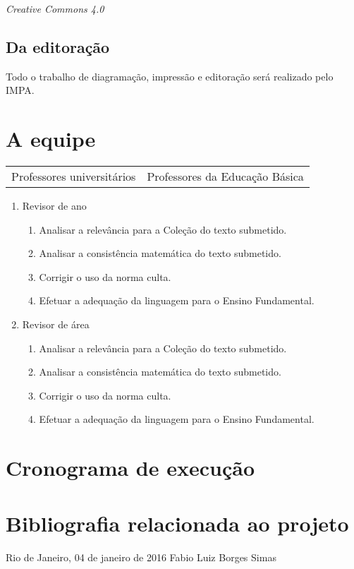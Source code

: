 \documentclass[10 pt]{article}
\begin{document}
{\it Creative Commons 4.0} %

\subsection{Da editoração}
Todo o trabalho de diagramação, impressão e editoração será realizado pelo IMPA.

\section{A equipe}\label{equipe}
\begin{table}[ht]
  \begin{center}
    \begin{tabular}{ll}
      Professores universitários & Professores da Educação Básica  \\
    \end{tabular}
  \end{center}
\end{table}





\begin{enumerate}%
\item Revisor de ano
  \begin{enumerate}%
  \item Analisar a relevância para a Coleção do texto submetido.
  \item Analisar a consistência matemática do texto submetido.
  \item Corrigir o uso da norma culta.
  \item Efetuar a adequação da linguagem para o Ensino Fundamental.
  \end{enumerate}

\item Revisor de área
  \begin{enumerate}%
  \item Analisar a relevância para a Coleção do texto submetido.
  \item Analisar a consistência matemática do texto submetido.
  \item Corrigir o uso da norma culta.
  \item Efetuar a adequação da linguagem para o Ensino Fundamental.
  \end{enumerate}
\end{enumerate}

\section{Cronograma de execução}

\section{Bibliografia relacionada ao projeto}

\begin{center}
  Rio de Janeiro, 04 de janeiro de 2016 \hspace{2cm} Fabio Luiz Borges Simas
\end{center}


% 
\end{document}
